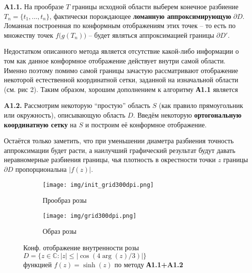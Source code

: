 \documentclass{article}
\theoremstyle{definition}
\newcommand{\q}[1]{``#1''}
\begin{document}
\begin{displayquote}
\textbf{A1.1.} На прообразе $T$ границы исходной области выберем конечное разбиение $T_n = \{t_1,...,t_n\}$, фактически порождающее \textbf{ломанную аппроксимирующую} $\partial D$. Ломанная построенная по конформным отображениям этих точек -- то есть по множеству точек $f\bigl(g(T_n)\bigr)$ -- будет являться аппроксимацией границы $\partial D'$.
\end{displayquote} \par
Недостатком описанного метода является отсутствие какой-либо информации о том как данное конформное отображение действует внутри самой области. Именно поэтому помимо самой границы зачастую рассматривают отображение некоторой естественной координатной сетки, заданной на изначальной области (см. рис 2). Таким образом, хорошим дополнением к алгоритму \textbf{А1.1} является
\begin{displayquote}
\textbf{A1.2.} Рассмотрим некоторую \q{простую} область $S$ (как правило прямоугольник или окружность), описывающую область $D$. Введём некоторую \textbf{ортогональную координатную сетку} на $S$ и построим её конформное отображение. 
\end{displayquote}
Остаётся только заметить, что при уменьшении диаметра разбиения точность аппроксимации будет расти, а наилучший графический результат будут давать неравномерные разбиения границы, чья плотность в окрестности точки $z$ границы $\partial D$ пропорциональна $|f(z)|$. \vspace*{-0.3cm}
\begin{figure}[h!]
    \centering
    \hspace{-0.5cm}
    \begin{subfigure}{0.48\textwidth}
        \texttt{[image: img/init\_grid300dpi.png]}
        \caption{\; Прообраз розы}
    \end{subfigure} \hspace{0.1cm}
    \begin{subfigure}{0.48\textwidth}
        \texttt{[image: img/grid300dpi.png]}
        \caption{\; Образ розы}
    \end{subfigure} \vspace*{5pt}
    \caption{ \centering Конф. отображение внутренности розы $D=\bigl\{ z\in \mathbb{C}:|z|\leq|\cos(4\arg(z)/3)|\bigr\}$ \\ функцией $f(z)=\sinh(z)$ по методу \textbf{А1.1+A1.2}}
\end{figure} \vspace*{-0.1cm}
\end{document}
